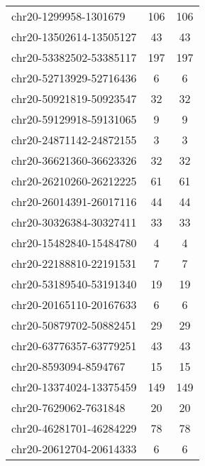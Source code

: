 \begin{longtable}{lSS}
	chr20-1299958-1301679   & 106    & 106                                       \\
	chr20-13502614-13505127 & 43     & 43                                        \\
	chr20-53382502-53385117 & 197    & 197                                       \\
	chr20-52713929-52716436 & 6      & 6                                         \\
	chr20-50921819-50923547 & 32     & 32                                        \\
	chr20-59129918-59131065 & 9      & 9                                         \\
	chr20-24871142-24872155 & 3      & 3                                         \\
	chr20-36621360-36623326 & 32     & 32                                        \\
	chr20-26210260-26212225 & 61     & 61                                        \\
	chr20-26014391-26017116 & 44     & 44                                        \\
	chr20-30326384-30327411 & 33     & 33                                        \\
	chr20-15482840-15484780 & 4      & 4                                         \\
	chr20-22188810-22191531 & 7      & 7                                         \\
	chr20-53189540-53191340 & 19     & 19                                        \\
	chr20-20165110-20167633 & 6      & 6                                         \\
	chr20-50879702-50882451 & 29     & 29                                        \\
	chr20-63776357-63779251 & 43     & 43                                        \\
	chr20-8593094-8594767   & 15     & 15                                        \\
	chr20-13374024-13375459 & 149    & 149                                       \\
	chr20-7629062-7631848   & 20     & 20                                        \\
	chr20-46281701-46284229 & 78     & 78                                        \\
	chr20-20612704-20614333 & 6      & 6                                         \\

\end{longtable}
